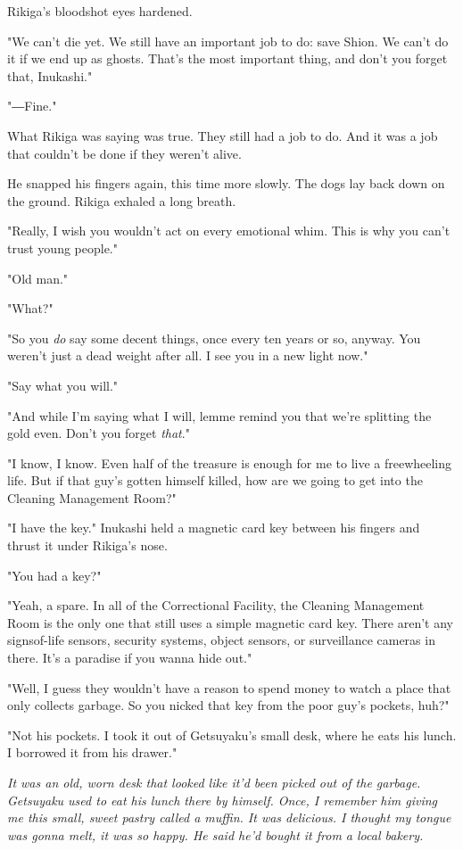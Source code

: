 Rikiga's bloodshot eyes hardened.

"We can't die yet. We still have an important job to do: save Shion. We
can't do it if we end up as ghosts. That's the most important thing, and
don't you forget that, Inukashi."

"―Fine."

What Rikiga was saying was true. They still had a job to do. And it was
a job that couldn't be done if they weren't alive.

He snapped his fingers again, this time more slowly. The dogs lay back
down on the ground. Rikiga exhaled a long breath.

"Really, I wish you wouldn't act on every emotional whim. This is why
you can't trust young people."

"Old man."

"What?"

"So you \emph{do} say some decent things, once every ten years or so, anyway.
You weren't just a dead weight after all. I see you in a new light now."

"Say what you will."

"And while I'm saying what I will, lemme remind you that we're splitting
the gold even. Don't you forget \emph{that}."

"I know, I know. Even half of the treasure is enough for me to live a
freewheeling life. But if that guy's gotten himself killed, how are we
going to get into the Cleaning Management Room?"

"I have the key." Inukashi held a magnetic card key between his fingers
and thrust it under Rikiga's nose.

"You had a key?"

"Yeah, a spare. In all of the Correctional Facility, the Cleaning
Management Room is the only one that still uses a simple magnetic card
key. There aren't any signsof-life sensors, security systems, object
sensors, or surveillance cameras in there. It's a paradise if you wanna
hide out."

"Well, I guess they wouldn't have a reason to spend money to watch a
place that only collects garbage. So you nicked that key from the poor
guy's pockets, huh?"

"Not his pockets. I took it out of Getsuyaku's small desk, where he eats
his lunch. I borrowed it from his drawer."

\emph{It was an old, worn desk that looked like it'd been picked out of the
garbage. Getsuyaku used to eat his lunch there by himself. Once, I
remember him giving me this small, sweet pastry called a muffin. It was
delicious. I thought my tongue was gonna melt, it was so happy. He said
he'd bought it from a local bakery.}

